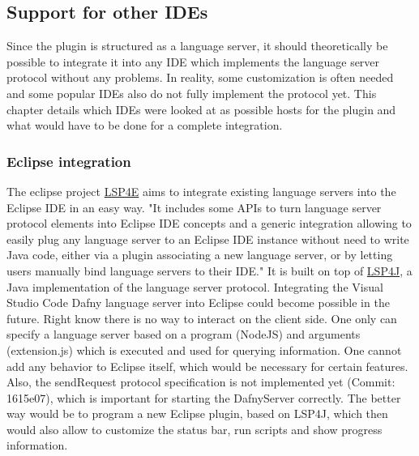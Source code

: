 \subsection{Support for other IDEs} \label{ides}
Since the plugin is structured as a language server, it should theoretically be possible to integrate it into any IDE which implements the language server protocol without any problems. In reality, some customization is often needed and some popular IDEs also do not fully implement the protocol yet. This chapter details which IDEs were looked at as possible hosts for the plugin and what would have to be done for a complete integration.
\subsubsection{Eclipse integration}
The eclipse project \href{https://projects.eclipse.org/projects/technology.lsp4e}{LSP4E} aims to integrate existing language servers into the Eclipse IDE in an easy way. 
\newline
"It includes some APIs to turn language server protocol elements into Eclipse IDE concepts and a generic integration allowing to easily plug any language server to an Eclipse IDE instance without need to write Java code, either via a plugin associating a new language server, or by letting users manually bind language servers to their IDE." \cite{lsp4e}
It is built on top of \href{https://github.com/eclipse/lsp4j}{LSP4J}, a Java implementation of the language server protocol. 
\newline
Integrating the Visual Studio Code Dafny language server into Eclipse could become possible in the future. Right know there is no way to interact on the client side. One only can specify a language server based on a program (NodeJS) and arguments (extension.js) which is executed and used for querying information. One cannot add any behavior to Eclipse itself, which would be necessary for certain features. Also, the sendRequest protocol specification is not implemented yet (Commit: 1615e07), which is important for starting the DafnyServer correctly. 
The better way would be to program a new Eclipse plugin, based on LSP4J, which then would also allow to customize the status bar, run scripts and show progress information. 
